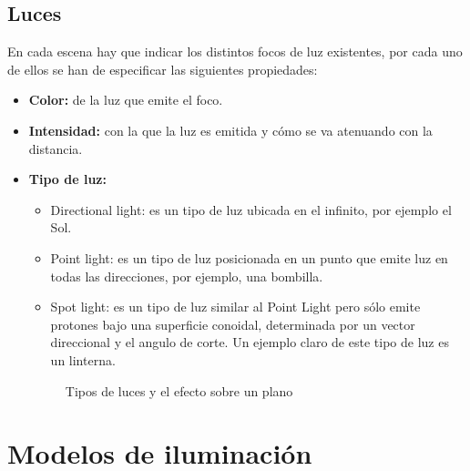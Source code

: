 \subsection{Luces}

En cada escena hay que indicar los distintos focos de luz existentes, por cada uno de ellos se han de especificar las siguientes propiedades:

\begin{itemize}
	\item \textbf{Color:}  de la luz que emite el foco.
	\item \textbf{Intensidad:} con la que la luz es emitida y cómo se va atenuando con la distancia.
	\item \textbf{Tipo de luz:}
	\begin{itemize}
		\item Directional light: es un tipo de luz ubicada en el infinito, por ejemplo el Sol.
		\item Point light: es un tipo de luz posicionada en un punto que emite luz en todas las direcciones, por ejemplo, una bombilla.
		\item Spot light: es un tipo de luz similar al Point Light pero sólo emite protones bajo una superficie conoidal, determinada por un vector direccional y el angulo de corte. Un ejemplo claro de este tipo de luz es un linterna.
	\end{itemize}
	
	\begin{figure}[!h]
	\centering

	\caption{Tipos de luces y el efecto sobre un plano}
	\end{figure}
\end{itemize}


\section{Modelos de iluminación}\label{modeloIluminacion}

